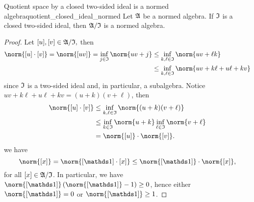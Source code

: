 \begin{lemma}{Quotient space by a closed two-sided ideal is a normed algebra}{quotient_closed_ideal_normed}
    Let \(\mathfrak{A}\) be a normed algebra. If \(\mathfrak{I}\) is a closed two-sided ideal, then \(\mathfrak{A}/\mathfrak{I}\) is a normed algebra.
\end{lemma}
\begin{proof}
    Let \([u],[v] \in \mathfrak{A}/\mathfrak{I},\) then
    \begin{align*}
        \norm{[u]\cdot[v]} = \norm{[uv]} = \inf_{j\in \algebra{I}}{\norm{uv + j}}
        &\leq \inf_{k,\ell \in \algebra{I}}{\norm{uv + \ell k}}\\
        &\leq \inf_{k,\ell \in \algebra{I}}{\norm{uv + k\ell + u \ell + kv}}
    \end{align*}
    since \(\mathfrak{I}\) is a two-sided ideal and, in particular, a subalgebra. Notice \(uv + k\ell + u \ell + kv = (u + k)(v + \ell)\), then
    \begin{align*}
        \norm{[u]\cdot[v]} &\leq \inf_{k,\ell \in \algebra{I}}{\norm{(u+k)(v + \ell)}}\\
                           &\leq \inf_{k\in\algebra{I}}{\norm{u+k}}\inf_{\ell \in \algebra{I}}{\norm{v+\ell}}\\
                           &= \norm{[u]}\cdot\norm{[v]}.
    \end{align*}
     we have
    \begin{equation*}
        \norm{[x]} = \norm{[\unity]\cdot[x]} \leq \norm{[\unity]}\cdot\norm{[x]},
    \end{equation*}
    for all \([x] \in \mathfrak{A}/\mathfrak{I}\). In particular, we have \(\norm{[\unity]}\left(\norm{[\unity]} - 1\right) \geq 0\), hence either \(\norm{[\unity]} = 0\) or \(\norm{[\unity]}\geq 1\). 
\end{proof}
